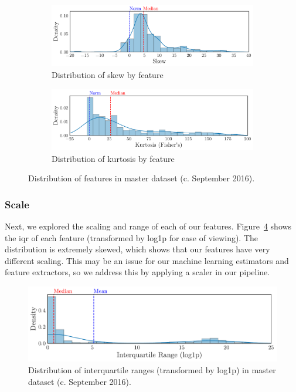 \documentclass[../thesis/thesis.tex]{subfiles}
\begin{document}
\begin{figure}[!htb]
    \centering
    \begin{subfigure}{\textwidth}
        \includegraphics[width=\textwidth]{../figures/design/skew}
        \caption{Distribution of skew by feature}
        \label{fig:design:normality:skew}
    \end{subfigure}
    \begin{subfigure}{\textwidth}
        \includegraphics[width=\textwidth]{../figures/design/kurtosis}
        \caption{Distribution of kurtosis by feature}
        \label{fig:design:normality:kurtosis}
    \end{subfigure}
    \caption[Dataset normality]{Distribution of features in master dataset (c. September 2016).}
    \label{fig:design:normality}
\end{figure}

\subsubsection{Scale}

Next, we explored the scaling and range of each of our features. Figure~\ref{fig:design:scaling} shows the \gls{iqr} of each feature (transformed by log1p for ease of viewing). The distribution is extremely skewed, which shows that our features have very different scaling. This may be an issue for our machine learning estimators and feature extractors, so we address this by applying a scaler in our pipeline.

\begin{figure}[!htb]
    \centering
    \includegraphics[width=\textwidth]{../figures/design/scaling}
    \caption[Dataset feature scaling]{Distribution of interquartile ranges (transformed by log1p) in master dataset (c. September 2016).}
    \label{fig:design:scaling}
\end{figure}
\end{document}

